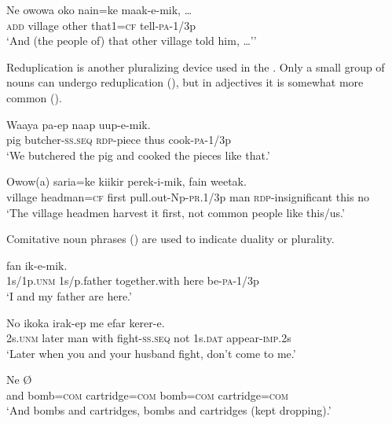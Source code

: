 \ea%
\label{ex:6:x1307}
\gll Ne  owowa  oko  nain=ke  maak-e-mik,  {\dots} \\
\textsc{add}  village  other  that1=\textsc{cf}  tell-\textsc{pa}-1/3p\\
\glt `And (the people of) that other village told him, {\dots}''
\z

Reduplication is another pluralizing device used in the . Only a small group of nouns can undergo reduplication (), but in adjectives it is somewhat more common ().

\ea%
\label{ex:6:x1290}
\gll Waaya  pa-ep    naap  uup-e-mik. \\
pig  butcher-\textsc{ss}.\textsc{seq}  \textsc{rdp}-piece  thus  cook-\textsc{pa}-1/3p\\
\glt `We butchered the pig and cooked the pieces like that.'
\z

\ea%
\label{ex:6:x1291}
\gll Owow(a)  saria=ke  kiikir  perek-i-mik,     fain  weetak.\\
village  headman=\textsc{cf}  first  pull.out-Np-\textsc{pr}.1/3p man  \textsc{rdp}-insignificant  this  no\\
\glt `The village headmen harvest it first, not common people like this/us.'
\z

Comitative noun phrases () are used to indicate duality or plurality. 

\ea%
\label{ex:6:x1292}
\gll {}      fan  ik-e-mik. \\
1s/1p.\textsc{unm}  1s/p.father  together.with  here  be-\textsc{pa}-1/3p\\
\glt `I and my father are here.'
\z

\ea%
\label{ex:6:x1293}
\gll No  ikoka      irak-ep  me  efar kerer-e.\\
2s.\textsc{unm}  later  man  with  fight-\textsc{ss}.\textsc{seq}  not  1s.\textsc{dat} appear-\textsc{imp}.2s\\
\glt `Later when you and your husband fight, don't come to me.'
\z

\ea%
\label{ex:6:x1294}
\gll Ne         {\O} \\
and  bomb=\textsc{com}  cartridge=\textsc{com}  bomb=\textsc{com}  cartridge=\textsc{com}\\
\glt `And bombs and cartridges, bombs and cartridges (kept dropping).'
\z

